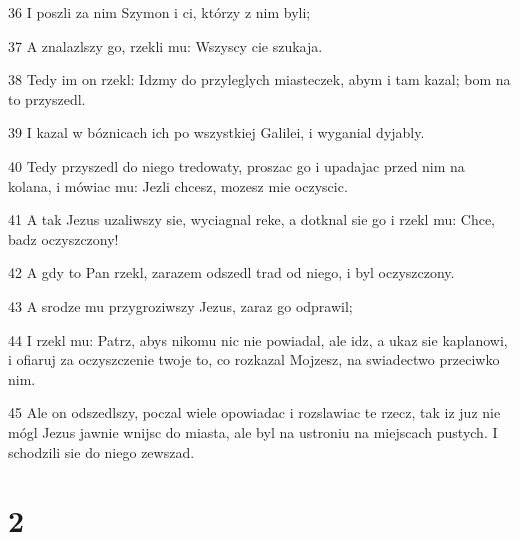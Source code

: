 \par 36 I poszli za nim Szymon i ci, którzy z nim byli;
\par 37 A znalazlszy go, rzekli mu: Wszyscy cie szukaja.
\par 38 Tedy im on rzekl: Idzmy do przyleglych miasteczek, abym i tam kazal; bom na to przyszedl.
\par 39 I kazal w bóznicach ich po wszystkiej Galilei, i wyganial dyjably.
\par 40 Tedy przyszedl do niego tredowaty, proszac go i upadajac przed nim na kolana, i mówiac mu: Jezli chcesz, mozesz mie oczyscic.
\par 41 A tak Jezus uzaliwszy sie, wyciagnal reke, a dotknal sie go i rzekl mu: Chce, badz oczyszczony!
\par 42 A gdy to Pan rzekl, zarazem odszedl trad od niego, i byl oczyszczony.
\par 43 A srodze mu przygroziwszy Jezus, zaraz go odprawil;
\par 44 I rzekl mu: Patrz, abys nikomu nic nie powiadal, ale idz, a ukaz sie kaplanowi, i ofiaruj za oczyszczenie twoje to, co rozkazal Mojzesz, na swiadectwo przeciwko nim.
\par 45 Ale on odszedlszy, poczal wiele opowiadac i rozslawiac te rzecz, tak iz juz nie mógl Jezus jawnie wnijsc do miasta, ale byl na ustroniu na miejscach pustych. I schodzili sie do niego zewszad.

\chapter{2}

